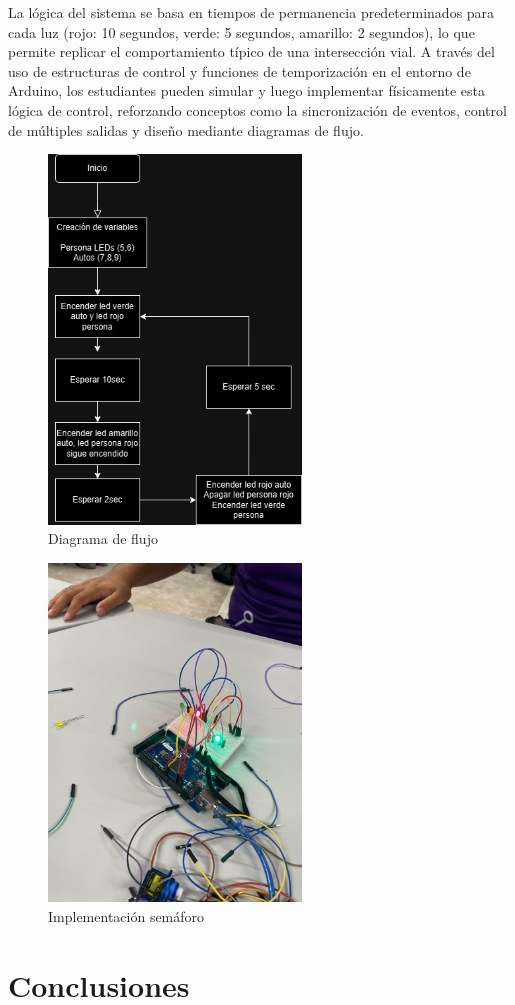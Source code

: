 \documentclass{article}
\begin{document}
La lógica del sistema se basa en tiempos de permanencia predeterminados para cada luz (rojo: 10 segundos, verde: 5 segundos, amarillo: 2 segundos), lo que permite replicar el comportamiento típico de una intersección vial. A través del uso de estructuras de control y funciones de temporización en el entorno de Arduino, los estudiantes pueden simular y luego implementar físicamente esta lógica de control, reforzando conceptos como la sincronización de eventos, control de múltiples salidas y diseño mediante diagramas de flujo.

\begin{figure}[H]
    \centering
    \includegraphics[width=0.6\textwidth]{./img/flujo_semaforo.png}
    \caption{Diagrama de flujo}
    \label{fig:leds_secuenciales_flowchart}
\end{figure}

\begin{figure}[H]
    \centering
    \includegraphics[width=0.6\textwidth]{./img/semaforo.jpeg}
    \caption{Implementación semáforo}
    \label{fig:leds_secuenciales_flowchart}
\end{figure}

\section{Conclusiones}



\end{document}
